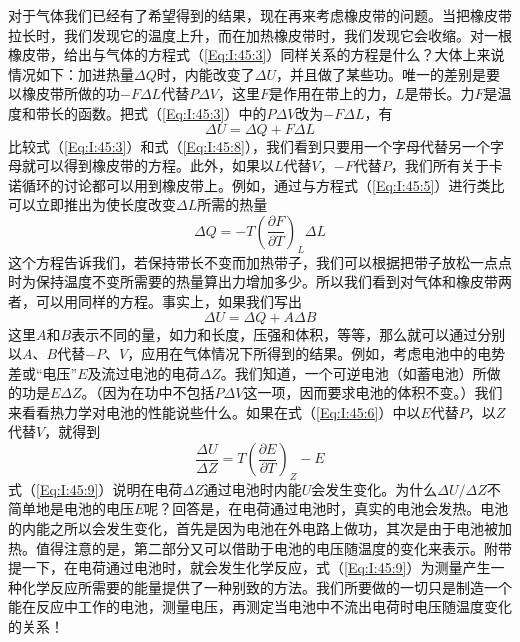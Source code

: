 对于气体我们已经有了希望得到的结果，现在再来考虑橡皮带的问题。当把橡皮带拉长时，我们发现它的温度上升，而在加热橡皮带时，我们发现它会收缩。对一根橡皮带，给出与气体的方程式（\ref{Eq:I:45:3}）同样关系的方程是什么？大体上来说情况如下：加进热量$\Delta Q$时，内能改变了$\Delta U$，并且做了某些功。唯一的差别是要以橡皮带所做的功$-F\Delta L$代替$P \Delta V$，这里$F$是作用在带上的力，$L$是带长。力$F$是温度和带长的函数。把式（\ref{Eq:I:45:3}）中的$P \Delta V$改为$-F \Delta L$，有
\begin{equation}
    \label{Eq:I:45:8}
    \Delta U = \Delta Q + F\Delta L
\end{equation}
比较式（\ref{Eq:I:45:3}）和式（\ref{Eq:I:45:8}），我们看到只要用一个字母代替另一个字母就可以得到橡皮带的方程。此外，如果以$L$代替$V$，$-F$代替$P$，我们所有关于卡诺循环的讨论都可以用到橡皮带上。例如，通过与方程式（\ref{Eq:I:45:5}）进行类比可以立即推出为使长度改变$\Delta L$所需的热量
\begin{equation*}
    \Delta Q = -T\left(\frac{\partial F}{\partial T}\right)_L \Delta L
\end{equation*}
这个方程告诉我们，若保持带长不变而加热带子，我们可以根据把带子放松一点点时为保持温度不变所需要的热量算出力增加多少。所以我们看到对气体和橡皮带两者，可以用同样的方程。事实上，如果我们写出
\begin{equation*}
    \Delta U = \Delta Q + A\Delta B
\end{equation*}
这里$A$和$B$表示不同的量，如力和长度，压强和体积，等等，那么就可以通过分别以$A$、$B$代替$-P$、$V$，应用在气体情况下所得到的结果。例如，考虑电池中的电势差或“电压”$E$及流过电池的电荷$\Delta Z$。我们知道，一个可逆电池（如蓄电池）所做的功是$E \Delta Z$。（因为在功中不包括$P \Delta V$这一项，因而要求电池的体积不变。）我们来看看热力学对电池的性能说些什么。如果在式（\ref{Eq:I:45:6}）中以$E$代替$P$，以$Z$代替$V$，就得到
\begin{equation}
    \label{Eq:I:45:9}
    \frac{\Delta U}{\Delta Z} = T\left(\frac{\partial E}{\partial T}\right)_Z - E
\end{equation}
式（\ref{Eq:I:45:9}）说明在电荷$\Delta Z$通过电池时内能$U$会发生变化。为什么$\Delta U /\Delta Z$不简单地是电池的电压$E$呢？回答是，在电荷通过电池时，真实的电池会发热。电池的内能之所以会发生变化，首先是因为电池在外电路上做功，其次是由于电池被加热。值得注意的是，第二部分又可以借助于电池的电压随温度的变化来表示。附带提一下，在电荷通过电池时，就会发生化学反应，式（\ref{Eq:I:45:9}）为测量产生一种化学反应所需要的能量提供了一种别致的方法。我们所要做的一切只是制造一个能在反应中工作的电池，测量电压，再测定当电池中不流出电荷时电压随温度变化的关系！

